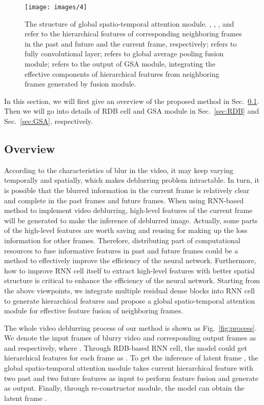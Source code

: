 \documentclass[twocolumn]{svjour3}          \smartqed  \usepackage{graphicx}
\begin{document}
\begin{figure}[!t]
	\centering
	\texttt{[image: images/4]}
	\caption{The structure of global spatio-temporal attention module. , , ,  and  refer to the hierarchical features of corresponding neighboring frames in the past and future and the current frame, respectively;  refers to fully convolutional layer;  refers to global average pooling fusion module;  refers to the output of GSA module, integrating the effective components of hierarchical features from neighboring frames generated by  fusion module.}
	\label{fig:gsa}
\end{figure}

In this section, we will first give an overview of the proposed method in Sec.~\ref{sec:overview}. Then we will go into details of RDB cell and GSA module in Sec.~\ref{sec:RDB} and Sec.~\ref{sec:GSA}, respectively.

\subsection{Overview}
\label{sec:overview}

According to the characteristics of blur in the video, it may keep varying temporally and spatially, which makes deblurring problem intractable. In turn, it is possible that the blurred information in the current frame is relatively clear and complete in the past frames and future frames. When using RNN-based method to implement video deblurring, high-level features of the current frame will be generated to make the inference of deblurred image. Actually, some parts of the high-level features are worth saving and reusing for making up the loss information for other frames. Therefore, distributing part of computational resources to fuse informative features in past and future frames could be a method to effectively improve the efficiency of the neural network. Furthermore, how to improve RNN cell itself to extract high-level features with better spatial structure is critical to enhance the efficiency of the neural network. Starting from the above viewpoints, we integrate multiple residual dense blocks into RNN cell to generate hierarchical features and propose a global spatio-temporal attention module for effective feature fusion of neighboring frames.

The whole video deblurring process of our method is shown as Fig.~\ref{fig:process}. We denote the input frames of blurry video and corresponding output frames as  and  respectively, where . Through RDB-based RNN cell, the model could get hierarchical features for each frame as . To get the inference of latent frame , the global spatio-temporal attention module takes current hierarchical feature  with two past and two future features  as input to perform feature fusion and generate  as output. Finally, through re-constructor module, the model can obtain the latent frame .
\end{document}
